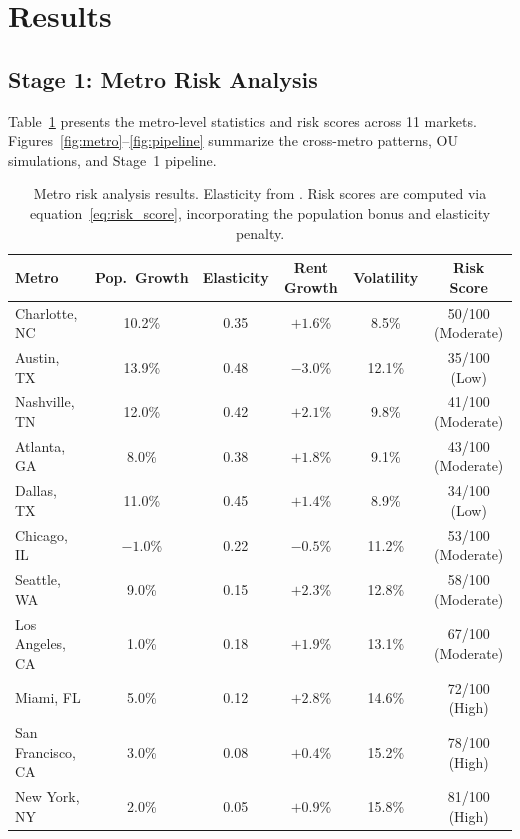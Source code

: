 \documentclass[11pt,letterpaper]{article}
\begin{document}
\section{Results}
\label{sec:results}

\subsection{Stage 1: Metro Risk Analysis}

Table~\ref{tab:metro_results} presents the metro-level statistics and risk scores across
11 markets. Figures~\ref{fig:metro}--\ref{fig:pipeline} summarize the cross-metro patterns,
OU simulations, and Stage~1 pipeline.

\begin{table}[H]
\centering
\caption{Metro risk analysis results. Elasticity from \citet{saiz2010}. Risk scores are
computed via equation~\eqref{eq:risk_score}, incorporating the \citet{glaeser2018}
population bonus and \citet{saiz2010} elasticity penalty.}
\label{tab:metro_results}
\begin{tabular}{lccccc}
\toprule
\textbf{Metro} &
\textbf{Pop.\ Growth} &
\textbf{Elasticity} &
\textbf{Rent Growth} &
\textbf{Volatility} &
\textbf{Risk Score} \\
\midrule
Charlotte, NC     & 10.2\%  & 0.35 & $+1.6$\% &  8.5\% & 50/100 (Moderate) \\
Austin, TX        & 13.9\%  & 0.48 & $-3.0$\% & 12.1\% & 35/100 (Low)      \\
Nashville, TN     & 12.0\%  & 0.42 & $+2.1$\% &  9.8\% & 41/100 (Moderate) \\
Atlanta, GA       &  8.0\%  & 0.38 & $+1.8$\% &  9.1\% & 43/100 (Moderate) \\
Dallas, TX        & 11.0\%  & 0.45 & $+1.4$\% &  8.9\% & 34/100 (Low)      \\
Chicago, IL       & $-1.0$\% & 0.22 & $-0.5$\% & 11.2\% & 53/100 (Moderate) \\
Seattle, WA       &  9.0\%  & 0.15 & $+2.3$\% & 12.8\% & 58/100 (Moderate) \\
Los Angeles, CA   &  1.0\%  & 0.18 & $+1.9$\% & 13.1\% & 67/100 (Moderate) \\
Miami, FL         &  5.0\%  & 0.12 & $+2.8$\% & 14.6\% & \textcolor{kejafiRed}{72/100 (High)} \\
San Francisco, CA &  3.0\%  & 0.08 & $+0.4$\% & 15.2\% & \textcolor{kejafiRed}{78/100 (High)} \\
New York, NY      &  2.0\%  & 0.05 & $+0.9$\% & 15.8\% & \textcolor{kejafiRed}{81/100 (High)} \\
\bottomrule
\end{tabular}
\end{table}
\end{document}
